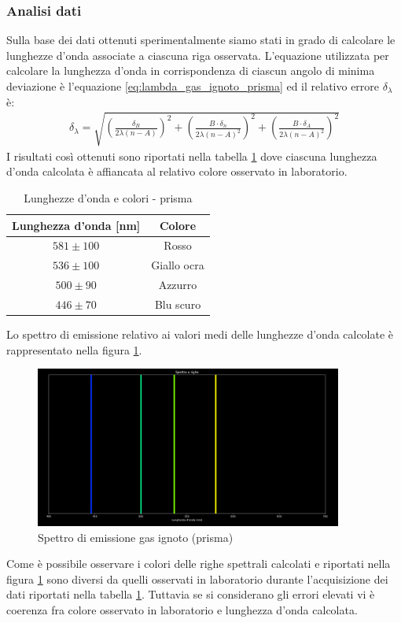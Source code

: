 \documentclass[a4paper]{article}
\begin{document}
\subsubsection{Analisi dati}
Sulla base dei dati ottenuti sperimentalmente siamo stati in grado di calcolare le lunghezze d'onda associate a ciascuna riga osservata. L'equazione utilizzata per calcolare la lunghezza d'onda in corrispondenza di ciascun angolo di minima deviazione è l'equazione \ref{eq:lambda_gas_ignoto_prisma} ed il relativo errore $\delta_{\lambda}$ è:
\begin{align}
\delta_\lambda = \sqrt{
\left( \frac{\delta_B}{2\lambda(n - A)} \right)^2 +
\left( \frac{B \cdot \delta_n}{2\lambda(n - A)^2} \right)^2 +
\left( \frac{B \cdot \delta_A}{2\lambda(n - A)^2} \right)^2
}
\label{eq:errore_su_lambda_prisma}
\end{align}
I risultati così ottenuti sono riportati nella tabella \ref{tab:tabella_lunghezze_d'onda_prisma} dove ciascuna lunghezza d'onda calcolata è affiancata al relativo colore osservato in laboratorio.
\begin{table}[htbp]
\centering
\begin{tabular}{|c|c|}
\hline
\textbf{Lunghezza d'onda [nm]} & \textbf{Colore} \\
\hline
$581\pm 100$ & Rosso \\
$536\pm 100$ & Giallo ocra \\
$500\pm 90$& Azzurro \\
$446\pm 70$& Blu scuro \\
\hline
\end{tabular}
\caption{Lunghezze d'onda e colori - prisma}
\label{tab:tabella_lunghezze_d'onda_prisma}
\end{table}
Lo spettro di emissione relativo ai valori medi delle lunghezze d'onda calcolate è rappresentato nella figura \ref{fig:spettro_emissione_gas_ignoto_prisma}.
\begin{figure}[htbp]
\centering
\includegraphics[width=0.9\textwidth]{grafici/spettro emissione gas ignoto prisma.png}
\caption{Spettro di emissione gas ignoto (prisma)}
\label{fig:spettro_emissione_gas_ignoto_prisma}
\end{figure}
Come è possibile osservare i colori delle righe spettrali calcolati e riportati nella figura \ref{fig:spettro_emissione_gas_ignoto_prisma} sono diversi da quelli osservati in laboratorio durante l'acquisizione dei dati riportati nella tabella \ref{tab:tabella_lunghezze_d'onda_prisma}. Tuttavia se si considerano gli errori elevati vi è coerenza fra colore osservato in laboratorio e lunghezza d'onda calcolata.
\end{document}

